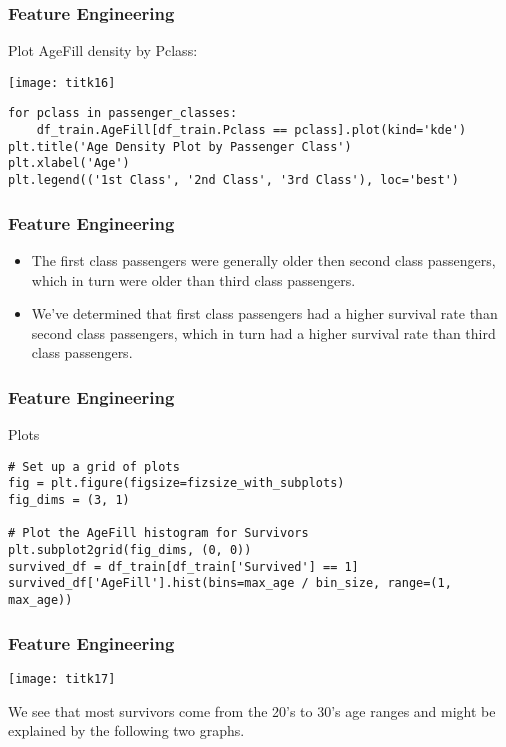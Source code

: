 \begin{frame}[fragile]\frametitle{Feature Engineering}
Plot AgeFill density by Pclass:

\begin{center}
\texttt{[image: titk16]}
\end{center}


\begin{lstlisting}
for pclass in passenger_classes:
    df_train.AgeFill[df_train.Pclass == pclass].plot(kind='kde')
plt.title('Age Density Plot by Passenger Class')
plt.xlabel('Age')
plt.legend(('1st Class', '2nd Class', '3rd Class'), loc='best')
\end{lstlisting}

\end{frame}


\begin{frame}[fragile]\frametitle{Feature Engineering}
\begin{itemize}
\item The first class passengers were generally older then second class passengers, which in turn were older than third class passengers. 
\item We've determined that first class passengers had a higher survival rate than second class passengers, which in turn had a higher survival rate than third class passengers.
\end{itemize}
\end{frame}

\begin{frame}[fragile]\frametitle{Feature Engineering}
Plots
\begin{lstlisting}
# Set up a grid of plots
fig = plt.figure(figsize=fizsize_with_subplots) 
fig_dims = (3, 1)

# Plot the AgeFill histogram for Survivors
plt.subplot2grid(fig_dims, (0, 0))
survived_df = df_train[df_train['Survived'] == 1]
survived_df['AgeFill'].hist(bins=max_age / bin_size, range=(1, max_age))
\end{lstlisting}
\end{frame}

\begin{frame}[fragile]\frametitle{Feature Engineering}
\begin{center}
\texttt{[image: titk17]}
\end{center}
We see that most survivors come from the 20's to 30's age ranges and might be explained by the following two graphs. 
\end{frame}

